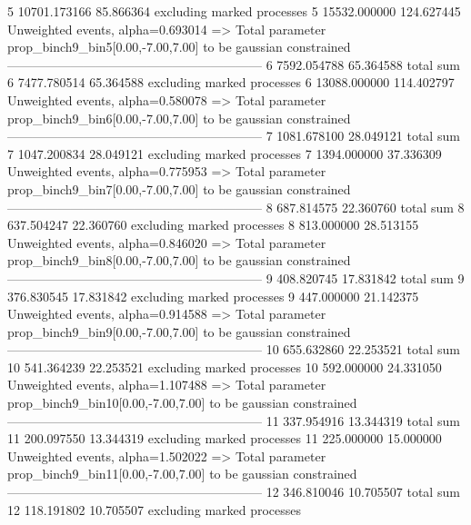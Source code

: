 5          10701.173166    85.866364       excluding marked processes    
5          15532.000000    124.627445      Unweighted events, alpha=0.693014
  => Total parameter prop_binch9_bin5[0.00,-7.00,7.00] to be gaussian constrained
------------------------------------------------------------
6          7592.054788     65.364588       total sum                     
6          7477.780514     65.364588       excluding marked processes    
6          13088.000000    114.402797      Unweighted events, alpha=0.580078
  => Total parameter prop_binch9_bin6[0.00,-7.00,7.00] to be gaussian constrained
------------------------------------------------------------
7          1081.678100     28.049121       total sum                     
7          1047.200834     28.049121       excluding marked processes    
7          1394.000000     37.336309       Unweighted events, alpha=0.775953
  => Total parameter prop_binch9_bin7[0.00,-7.00,7.00] to be gaussian constrained
------------------------------------------------------------
8          687.814575      22.360760       total sum                     
8          637.504247      22.360760       excluding marked processes    
8          813.000000      28.513155       Unweighted events, alpha=0.846020
  => Total parameter prop_binch9_bin8[0.00,-7.00,7.00] to be gaussian constrained
------------------------------------------------------------
9          408.820745      17.831842       total sum                     
9          376.830545      17.831842       excluding marked processes    
9          447.000000      21.142375       Unweighted events, alpha=0.914588
  => Total parameter prop_binch9_bin9[0.00,-7.00,7.00] to be gaussian constrained
------------------------------------------------------------
10         655.632860      22.253521       total sum                     
10         541.364239      22.253521       excluding marked processes    
10         592.000000      24.331050       Unweighted events, alpha=1.107488
  => Total parameter prop_binch9_bin10[0.00,-7.00,7.00] to be gaussian constrained
------------------------------------------------------------
11         337.954916      13.344319       total sum                     
11         200.097550      13.344319       excluding marked processes    
11         225.000000      15.000000       Unweighted events, alpha=1.502022
  => Total parameter prop_binch9_bin11[0.00,-7.00,7.00] to be gaussian constrained
------------------------------------------------------------
12         346.810046      10.705507       total sum                     
12         118.191802      10.705507       excluding marked processes    
